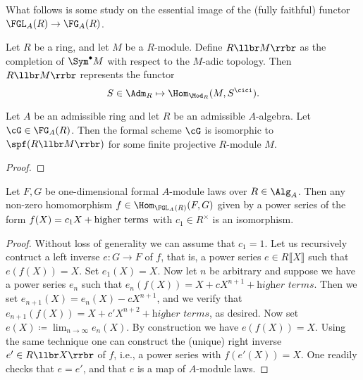 \documentclass[../main.tex]{subfiles}
\begin{document}
\vspace{6pt}
What follows is some study on the essential image of the (fully faithful)
functor $\FGL_A(R) \to
\FG_A(R)$.

\begin{defi}[]
    Let $R$ be a ring, and let $M$ be a $R$-module. Define
    $R\llbr M \rrbr$ as the completion of $\Sym^\bullet M$ with respect to 
    the $M$-adic topology. Then $R\llbr M \rrbr$ represents the functor 
    \begin{equation*}
        S \in \Adm_R \mapsto \Hom_{\Mod_R}(M, S^\cici).
    \end{equation*}
\end{defi}

\begin{lem}
    Let $A$ be an admissible ring and let $R$ be an admissible $A$-algebra. 
    Let $\cG \in \FG_A(R)$. Then the formal scheme $\cG$ is isomorphic to
    $\spf(R \llbr M \rrbr)$ for some finite projective $R$-module $M$.
\end{lem}
\begin{proof}
\end{proof}

\begin{lem}\label{lem:inversegrouphom}
    Let $F,G$ be one-dimensional formal $A$-module laws over $R \in \Alg_A$.
    Then any non-zero homomorphism $f\in \Hom_{\FGL_A(R)}(F,G)$ 
    given by a power series of the form $f(X) = c_1X + \textnormal{higher
    terms}$ with $c_1 \in R^\times$ is an isomorphism.
\begin{proof}
    Without loss of generality we can assume that $c_1 = 1$. Let us recursively
    contruct a left inverse $e: G \to F$ of $f$, that is, a power series
    $e \in R\llbracket X \rrbracket$ such that $e(f(X)) = X$. Set
    $e_1(X) = X$. Now let $n$ be arbitrary and suppose we have a power series 
    $e_n$ such that $e_n(f(X)) = X + cX^{n+1} + \textit{higher terms}$. Then we 
    set $e_{n+1}(X) = e_n(X) - cX^{n+1}$, and we verify that 
    $e_{n+1}(f(X)) = X + c'X^{n+2} + \textit{higher terms}$, as desired. Now set
    $e(X) \coloneqq \lim_{n \to \infty} e_{n}(X)$. By construction we have
    $e(f(X)) = X$. Using the same technique one can construct the (unique) right inverse 
    $e' \in R\llbr X \rrbr$ of $f$, i.e., a power series with $f(e'(X)) = X$. 
    One readily checks that $e = e'$, and that $e$ is a map of $A$-module laws.
\end{proof}
\end{lem}
\end{document}
